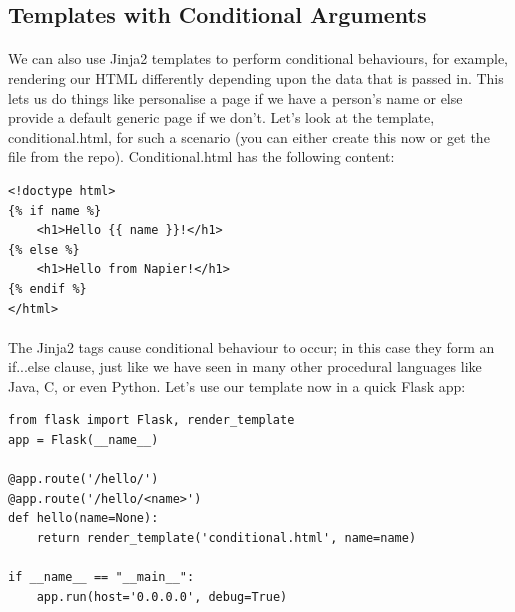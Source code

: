 \documentclass[12pt, a4paper, oneside]{book}
\begin{document}
\subsection{Templates with Conditional Arguments}
\label{templates-conditional}
\paragraph{} We can also use Jinja2 templates to perform conditional behaviours, for example, rendering our HTML differently depending upon the data that is passed in. This lets us do things like personalise a page if we have a person's name or else provide a default generic page if we don't. Let's look at the template, conditional.html, for such a scenario (you can either create this now or get the file from the repo). Conditional.html has the following content:

\begin{lstlisting}
<!doctype html>
{% if name %}
    <h1>Hello {{ name }}!</h1>
{% else %}
    <h1>Hello from Napier!</h1>
{% endif %}
</html>
\end{lstlisting}

\paragraph{} The Jinja2 tags cause conditional behaviour to occur; in this case they form an if...else clause, just like we have seen in many other procedural languages like Java, C, or even Python. Let's use our template now in a quick Flask app:

\begin{lstlisting}
from flask import Flask, render_template
app = Flask(__name__)

@app.route('/hello/')
@app.route('/hello/<name>')
def hello(name=None):
    return render_template('conditional.html', name=name)

if __name__ == "__main__":
    app.run(host='0.0.0.0', debug=True)
\end{lstlisting}
\end{document}
